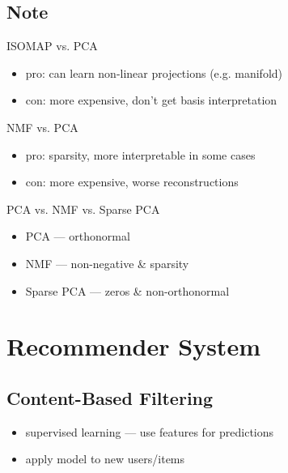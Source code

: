 \documentclass[10pt,landscape,a4paper]{article}
\begin{document}
\begin{multicols*}{5}
\subsection{Note}
ISOMAP vs. PCA
\begin{itemize}
    \item pro: can learn non-linear projections (e.g. manifold)
    \item con: more expensive, don't get basis interpretation
\end{itemize}
NMF vs. PCA
\begin{itemize}
    \item pro: sparsity, more interpretable in some cases
    \item con: more expensive, worse reconstructions
\end{itemize}
PCA vs. NMF vs. Sparse PCA
\begin{itemize}
    \item PCA --- orthonormal
    \item NMF --- non-negative \& sparsity
    \item Sparse PCA --- zeros \& non-orthonormal
\end{itemize}

\section{Recommender System}

\subsection{Content-Based Filtering}
\begin{itemize}
    \item supervised learning --- use features for predictions
    \item apply model to new users/items
\end{itemize}


\end{multicols*}
\end{document}
